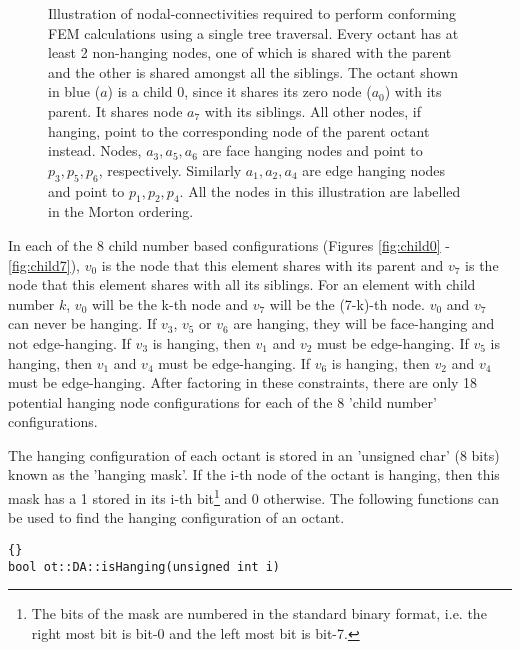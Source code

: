 \documentclass[10pt,reqno,a4paper]{report}
\numberwithin{equation}{section}
\begin{document}
\begin{figure}
  \begin{center} 
   \label{fig:hanging}
   
  \caption{ Illustration of nodal-connectivities required to perform conforming
  FEM calculations using a single tree traversal. Every octant has at least 2 non-hanging nodes, one of which is
  shared with the parent and the other is shared amongst all the
  siblings. The octant shown in blue ($a$) is a child 0, since it shares its zero node
  ($a_0$) with its parent. It shares node $a_7$ with its siblings. All other nodes, if hanging, 
  point to the corresponding node of the parent octant instead. Nodes, $a_3, a_5, a_6$ are face
  hanging nodes and point to $p_3, p_5, p_6$, respectively. Similarly
  $a_1, a_2, a_4$ are edge hanging nodes and point to $p_1, p_2,
  p_4$. All the nodes in this illustration are labelled in the Morton ordering.} 
  \end {center}
\end{figure}

In each of the 8 child number based configurations (Figures \ref{fig:child0} - \ref{fig:child7}), $v_0$ is the node that this element shares with its parent and $v_7$ is the node that this element shares with all its siblings. For an element with child number $k$, $v_0$ will be the k-th node and $v_7$ will be the (7-k)-th node. $v_0$ and $v_7$ can never be hanging. If $v_3$, $v_5$ or $v_6$ are hanging, they will be face-hanging and not edge-hanging. If $v_3$ is hanging, then $v_1$ and $v_2$ must be edge-hanging. If $v_5$ is hanging, then $v_1$ and $v_4$ must be edge-hanging. If $v_6$ is hanging, then $v_2$ and $v_4$ must be edge-hanging. After factoring in these constraints, there are only 18 potential hanging node configurations for each of the 8 'child number' configurations.

The hanging configuration of each octant is stored in an 'unsigned char' (8 bits) known as the 'hanging mask'. If the i-th node of the octant is hanging, then this mask has a 1 stored in its i-th bit\footnote{The bits of the mask are numbered in the standard binary format, i.e. the right most bit is bit-0 and the left most bit is bit-7.} and 0 otherwise. The following functions can be used to find the hanging configuration of an octant.

\begin{lstlisting}[frame=trbl, fontadjust]{}
bool ot::DA::isHanging(unsigned int i)
\end{lstlisting}
\end{document}
